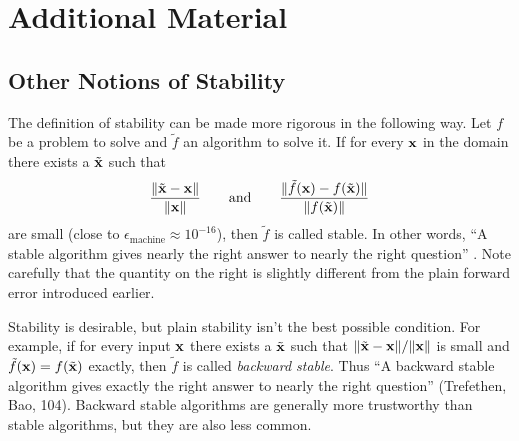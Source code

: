 \newpage

\section*{Additional Material} %

\subsection*{Other Notions of Stability} %

The definition of stability can be made more rigorous in the following way.
Let $f$ be a problem to solve and $\tilde{f}$ an algorithm to solve it.
If for every $\mathbf{x}$ in the domain there exists a $\tilde{\mathbf{x}}$ such that
\[
\frac{\|\tilde{\mathbf{x}} - \mathbf{x}\|}{\|\mathbf{x}\|}
\qquad\text{and}\qquad
\frac{\|\tilde{f}(\mathbf{x}) - f(\tilde{\mathbf{x}})\|}{\|f(\tilde{\mathbf{x}})\|}
\]
are small (close to $\epsilon_{\text{machine}} \approx 10^{-16}$), then $\tilde{f}$ is called stable.
In other words, ``A stable algorithm gives nearly the right answer to nearly the right question'' \cite[p.104]{Trefethen1997}.
Note carefully that the quantity on the right is slightly different from the plain forward error introduced earlier.

Stability is desirable, but plain stability isn't the best possible condition.
For example, if for every input $\mathbf{x}$ there exists a $\tilde{\mathbf{x}}$ such that
$\|\tilde{\mathbf{x}} - \mathbf{x}\| / \|\mathbf{x}\|$ is small and $\tilde{f}(\mathbf{x}) = f(\tilde{\mathbf{x}})$ exactly, then $\tilde{f}$ is called \emph{backward stable}.
Thus ``A backward stable algorithm gives exactly the right answer to nearly the right question'' (Trefethen, Bao, 104).
Backward stable algorithms are generally more trustworthy than stable algorithms, but they are also less common.

